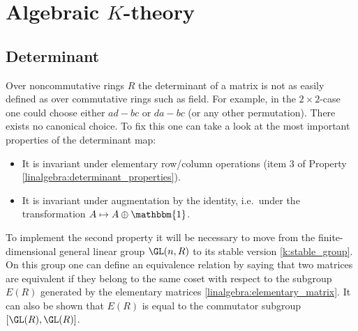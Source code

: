 {    

\section{\texorpdfstring{Algebraic $K$-theory}{Algebraic K-theory}}
\subsection{Determinant}

    Over noncommutative rings $R$ the determinant of a matrix is not as easily defined as over commutative rings such as field. For example, in the $2\times2$-case one could choose either $ad-bc$ or $da-bc$ (or any other permutation). There exists no canonical choice. To fix this one can take a look at the most important properties of the determinant map:
    \begin{itemize}
        \item It is invariant under elementary row/column operations (item 3 of Property \ref{linalgebra:determinant_properties}).
        \item It is invariant under augmentation by the identity, i.e.~under the transformation $A\mapsto A\oplus\mathbbm{1}$.
    \end{itemize}
    To implement the second property it will be necessary to move from the finite-dimensional general linear group $\GL(n,R)$ to its stable version \ref{k:stable_group}. On this group one can define an equivalence relation by saying that two matrices are equivalent if they belong to the same coset with respect to the subgroup $E(R)$ generated by the elementary matrices \ref{linalgebra:elementary_matrix}. It can also be shown that $E(R)$ is equal to the commutator subgroup $[\GL(R),\GL(R)]$.

}
